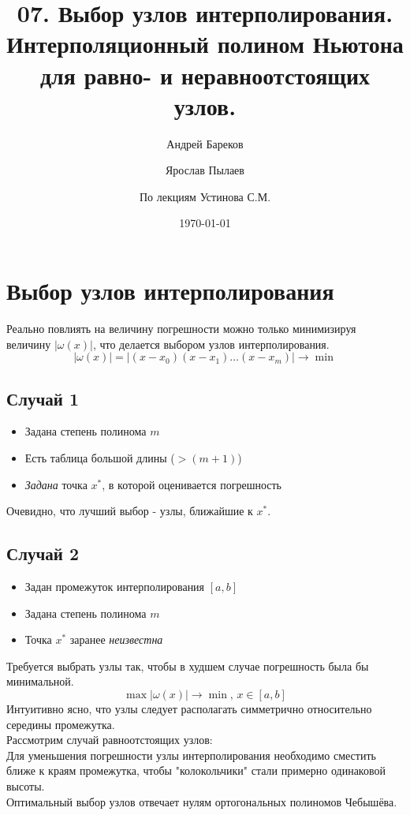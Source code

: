 \documentclass[a4paper,11pt]{article}
\title{07. Выбор узлов интерполирования. Интерполяционный полином Ньютона для равно- и неравноотстоящих узлов.}
\author{Андрей Бареков \and Ярослав Пылаев \and По лекциям Устинова С.М.}
\date{\today}
\begin{document}
\maketitle
\newpage

\section{Выбор узлов интерполирования}
Реально повлиять на величину погрешности можно только минимизируя величину $|\omega(x)|$, что делается выбором узлов интерполирования.
\[|\omega(x)| = |(x-x_0)(x-x_1)\dots(x-x_m)| \rightarrow \min\]

  \subsection{Случай 1}
  \begin{itemize}
    \item Задана степень полинома $m$
    \item Есть таблица большой длины ($>(m + 1)$)
    \item \textit{Задана} точка $x^*$, в которой оценивается погрешность
  \end{itemize}
  Очевидно, что лучший выбор - узлы, ближайшие к $x^*$.

  \subsection{Случай 2}
  \begin{itemize}
    \item Задан промежуток интерполирования $[a, b]$
    \item Задана степень полинома $m$
    \item Точка $x^*$ заранее \textit{неизвестна}
  \end{itemize}
  Требуется выбрать узлы так, чтобы в худшем случае погрешность была бы минимальной.
  \[\max |\omega(x)| \rightarrow \min, \, x \in [a, b]\]
  Интуитивно ясно, что узлы следует располагать симметрично относительно середины промежутка. \\
  Рассмотрим случай равноотстоящих узлов: \\
  Для уменьшения погрешности узлы интерполирования необходимо сместить ближе к краям промежутка, чтобы "колокольчики" стали примерно одинаковой высоты. \\
  Оптимальный выбор узлов отвечает нулям ортогональных полиномов Чебышёва.

\newpage
\end{document}
